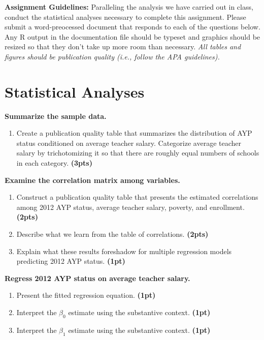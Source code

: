 \documentclass[]{article}
\begin{document}
\pagebreak

\noindent \textbf{Assignment Guidelines:} Paralleling the analysis we have carried out in class, conduct the statistical analyses necessary to complete this assignment. Please submit a word-preocessed document that responds to each of the questions below. Any R output in the documentation file should be typeset and graphics should be resized so that they don't take up more room than necessary. \textit{All tables and figures should be publication quality (i.e., follow the APA guidelines).}



\section*{Statistical Analyses}

\noindent\textbf{Summarize the sample data.}

\begin{enumerate}
\item Create a publication quality table that summarizes the distribution of AYP status conditioned on average teacher salary. Categorize average teacher salary by trichotomizing it so that there are roughly equal numbers of schools in each category. \textbf{(3pts)}\\
\end{enumerate}  

\vspace{\baselineskip}
 
\noindent\textbf{Examine the correlation matrix among variables.}
 
\begin{enumerate}[resume]
\item Construct a publication quality table that presents the estimated correlations among 2012 AYP status, average teacher salary, poverty, and enrollment. \textbf{(2pts)}
\item Describe what we learn from the table of correlations.  \textbf{(2pts)}
\item Explain what these results foreshadow for multiple regression models predicting 2012 AYP status. \textbf{(1pt)} \\
\end{enumerate}

\vspace{\baselineskip}

\noindent\textbf{Regress 2012 AYP status on average teacher salary.}

\begin{enumerate}[resume]
\item Present the fitted regression equation. \textbf{(1pt)}
\item Interpret the $\beta_0$ estimate using the substantive context. \textbf{(1pt)}
\item Interpret the $\beta_1$ estimate using the substantive context. \textbf{(1pt)}
\end{enumerate}
\end{document}
